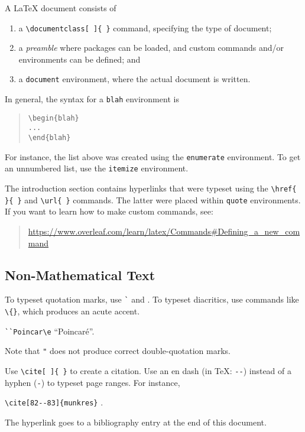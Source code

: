 \documentclass[a4paper,10pt,leqno]{article}
\numberwithin{equation}{section}
\theoremstyle{plain}
\theoremstyle{definition}
\theoremstyle{remark}
\begin{document}
A \LaTeX{} document consists of
\begin{enumerate} 
\item 	a \verb|\documentclass[ ]{ }| command, specifying the type of document; 

\item 	a \emph{preamble} where packages can be loaded, and custom commands and/or environments can be defined; and

\item 	a \texttt{document} environment, where the actual document is written.

\end{enumerate}
In general, the syntax for a \texttt{blah} environment is
\begin{quote}
\verb|\begin{blah}|\\
\verb|...|\\
\verb|\end{blah}|
\end{quote}
For instance, the list above was created using the \texttt{enumerate} environment.
To get an unnumbered list, use the \texttt{itemize} environment.

The introduction section contains hyperlinks that were typeset using the \verb|\href{ }{ }| and \verb|\url{ }| commands.
The latter were placed within \texttt{quote} environments.
If you want to learn how to make custom commands, see:
\begin{quote}
\url{https://www.overleaf.com/learn/latex/Commands#Defining_a_new_command}
\end{quote}

\subsection{Non-Mathematical Text}
 
To typeset quotation marks, use \texttt{\`{}} and \texttt{\textquotesingle}.
To typeset diacritics, use commands like \texttt{\textbackslash\textquotesingle\{\}}, which produces an acute accent.
\begin{center}
\texttt{\`{}\`{}Poincar\textbackslash\textquotesingle{}e\textquotesingle\textquotesingle}
\quad
``Poincar\'e''.
\end{center}
Note that \texttt{"} does not produce correct double-quotation marks.

Use \texttt{\textbackslash{}cite[ ]\{ \}} to create a citation.
Use an en dash (in \TeX: \texttt{-{}-}) instead of a hyphen (\texttt{-}) to typeset page ranges.
For instance,
\begin{center}
\verb|\cite[82--83]{munkres}|
\quad
\cite[82--83]{munkres}.
\end{center}
The hyperlink goes to a bibliography entry at the end of this document.
\end{document}
